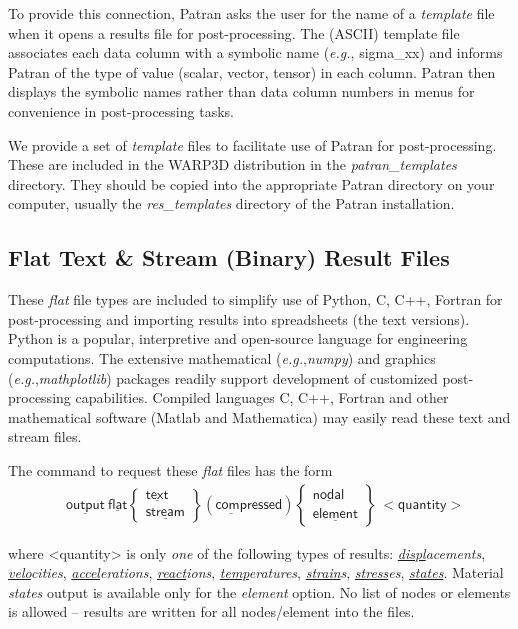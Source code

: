 \documentclass[11pt]{report}
\numberwithin{equation}{section}
\newcommand{\nin} {\noindent}
\newcommand{\ul} {\underline}
\newcommand{\hv} {\mathsf}   %
\newcommand{\eg}{\emph{e.g.},\xspace}
\newcommand{\ti}{\emph}
\newcommand{\tl}{\textless\xspace}
\newcommand{\tg}{\textgreater\xspace}
\begin{document}
To provide this connection, Patran asks the user for the name of a \ti{template} file
when it opens a results file for post-processing. The (ASCII) template file
associates each data column with a symbolic name (\eg sigma\_xx) and informs
Patran of the type of value (scalar, vector, tensor) in each column. Patran then
displays the symbolic names rather than
data column numbers in menus for convenience in
post-processing tasks.

We provide a set of \ti{template} files to facilitate use of Patran for
post-processing. These are included in the
WARP3D distribution in the \ti{patran\_templates} directory.
They should be copied into the appropriate Patran directory
on your computer, usually the \ti{res\_templates} directory of the Patran
installation. 
\subsection{Flat Text \& Stream (Binary) Result Files}
\nin
These \ti{flat} file types are included to simplify use of Python, C, C++, Fortran
for post-processing
and importing  results into spreadsheets (the text versions).
Python is a popular, interpretive and open-source language for
engineering computations. The extensive mathematical (\eg \ti{numpy}) and 
graphics (\eg \ti{mathplotlib}) packages readily support  development of 
customized post-processing capabilities.
Compiled languages C, C++, Fortran and other mathematical software
(Matlab and Mathematica) may easily read these text and stream files.

The command to request these \ti{flat} files 
has the form
\begin{align*}
& \hv{\ul{output}\ \ul{flat}   }
\begin{Bmatrix}
\hv{\ul{text}} \\ \hv{\ul{stream}} 
\end{Bmatrix} 
(\hv{\ul{comp}ressed})
\begin{Bmatrix}
\hv{\ul{nodal}} \\ \hv{\ul{element}} 
\end{Bmatrix} \ \hv{<quantity>}
\end{align*}

\nin
where \tl{quantity}\tg is only \ti{one} of the following types of results: 
\ti{\ul{displ}acements},
\ti{\ul{velo}cities}, 
\ti{\ul{accel}erations}, \ti{\ul{react}ions}, \ti{\ul{temp}eratures}, \ti{\ul{strain}s}, 
\ti{\ul{stress}es}, \ti{\ul{states}}. Material  \ti{states} output is available only for the
\ti{element} option. No list of nodes or elements is allowed -- results 
are written for all nodes/element into the files.
\end{document}
